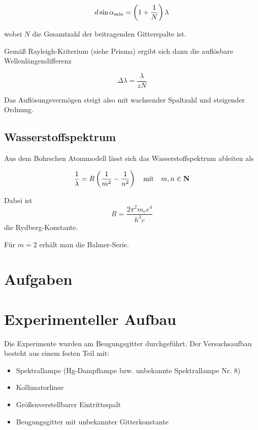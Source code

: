 \documentclass[a4paper,german,12pt,smallheadings]{scrartcl}
\begin{document}
\begin{equation}
  d \sin \alpha_\text{min} = \del{1 + \frac{1}{N}} \lambda
\end{equation}

wobei $N$ die Gesamtzahl der beitragenden Gitterspalte ist.

Gemäß Rayleigh-Kriterium (siehe Prisma) ergibt sich dann die auflösbare
Wellenlängendifferenz

\begin{equation}
  \Delta \lambda = \frac{\lambda}{z N}
\end{equation}

Das Auflösungsvermögen steigt also mit wachsender Spaltzahl und steigender Ordnung.

\subsection{Wasserstoffspektrum}

Aus dem Bohrschen Atommodell lässt sich das Wasserstoffspektrum ableiten als

\begin{equation}
  \frac{1}{\lambda} = R \del{ \frac{1}{m^2} - \frac{1}{n^2}}
  \quad \text{mit} \quad m,n \in \mathbf{N}
\end{equation}

Dabei ist
\begin{equation}
  R = \frac{2 \pi^2 m_e e^4}{h^3 c}
\end{equation}
die Rydberg-Konstante.

Für $m = 2$ erhält man die Balmer-Serie.

\newpage
\section{Aufgaben}

\section{Experimenteller Aufbau}

Die Experimente wurden am Beugungsgitter durchgeführt. Der Versuchsaufbau
besteht aus einem festen Teil mit:

\begin{itemize}
  \item Spektrallampe (Hg-Dampflampe bzw. unbekannte Spektrallampe Nr. 8)
  \item Kollimatorlinse
  \item Größenverstellbarer Eintrittsspalt
  \item Beugungsgitter mit unbekannter Gitterkonstante
\end{itemize}
\end{document}
